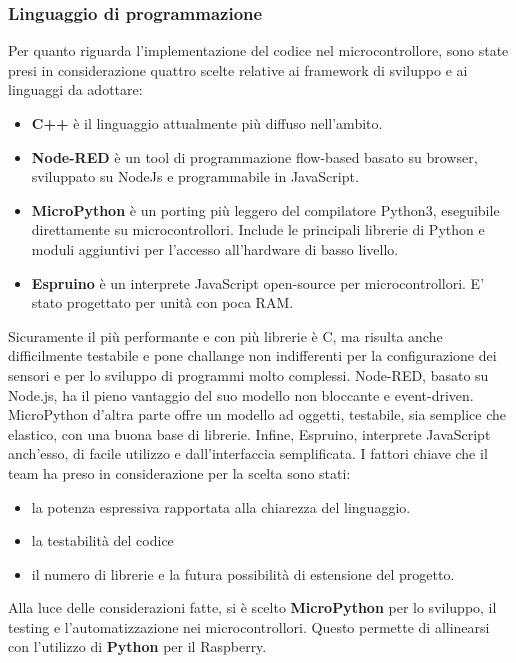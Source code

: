         \subsubsection{Linguaggio di programmazione}
        Per quanto riguarda l'implementazione del codice nel microcontrollore, sono state presi in considerazione quattro scelte relative ai framework di sviluppo e ai linguaggi da adottare: 
        \begin{itemize}
            \item \textbf{C++} è il linguaggio attualmente più diffuso nell'ambito. 
            \item \textbf{Node-RED} è un tool di programmazione flow-based basato su browser, sviluppato su NodeJs e programmabile in JavaScript.
            \item \textbf{MicroPython} è un porting più leggero del compilatore Python3, eseguibile direttamente su microcontrollori. Include le principali librerie di Python e moduli aggiuntivi per l'accesso all'hardware di basso livello.
            \item \textbf{Espruino} è un interprete JavaScript open-source per microcontrollori. E' stato progettato per unità con poca RAM.
        \end{itemize}
        Sicuramente il più performante e con più librerie è C, ma risulta anche difficilmente testabile e pone challange non indifferenti per la configurazione dei sensori e per lo sviluppo di programmi molto complessi. Node-RED, basato su Node.js, ha il pieno vantaggio del suo modello non bloccante e event-driven. MicroPython d'altra parte offre un modello ad oggetti, testabile, sia semplice che elastico, con una buona base di librerie. Infine, Espruino, interprete JavaScript anch'esso, di facile utilizzo e dall'interfaccia semplificata. 
        I fattori chiave che il team ha preso in considerazione per la scelta sono stati: 
        \begin{itemize}
            \item la potenza espressiva rapportata alla chiarezza del linguaggio. 
            \item la testabilità del codice
            \item il numero di librerie e la futura possibilità di estensione del progetto.
        \end{itemize}
        Alla luce delle considerazioni fatte, si è scelto \textbf{MicroPython} per lo sviluppo, il testing e l'automatizzazione nei microcontrollori. Questo permette di allinearsi con l'utilizzo di \textbf{Python} per il Raspberry.


